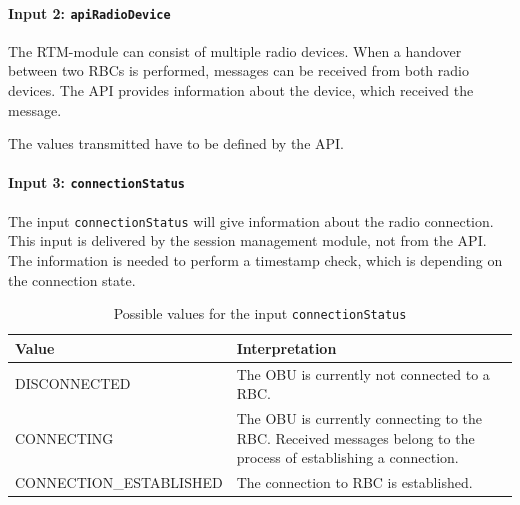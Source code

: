 \documentclass{template/openetcs_report}
\begin{document}
\paragraph{Input 2: \texttt{apiRadioDevice}}
The RTM-module can consist of multiple radio devices. When a handover between two RBCs is performed, messages can be received from both radio devices. The API provides information about the device, which received the message.

The values transmitted have to be defined by the API.

\paragraph{Input 3: \texttt{connectionStatus}}
The input \texttt{connectionStatus} will give information about the radio connection. This input is delivered by the session management module, not from the API. The information is needed to perform a timestamp check, which is depending on the connection state.

\begin{table}[H]
  \begin{tabular}{| l | p{9cm} |}
    \hline
    \textbf{Value} & \textbf{Interpretation}\\ \hline
    DISCONNECTED & The OBU is currently not connected to a RBC.\\
    CONNECTING & The OBU is currently connecting to the RBC. Received messages belong to the process of establishing a connection.\\
    CONNECTION\_ESTABLISHED &  The connection to RBC is established.\\
    \hline
  \end{tabular} 
  \caption{Possible values for the input \texttt{connectionStatus}}
  \label{tbl:connectionStatus}
\end{table}

% 
% 
% 
\end{document}
